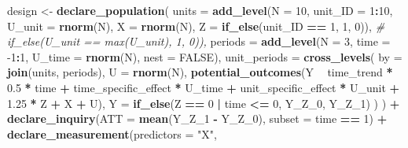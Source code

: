 \documentclass[
]{article}
\newenvironment{Shaded}{\begin{snugshade}}{\end{snugshade}}
\newcommand{\CommentTok}[1]{\textcolor[rgb]{0.56,0.35,0.01}{\textit{#1}}}
\newcommand{\DataTypeTok}[1]{\textcolor[rgb]{0.13,0.29,0.53}{#1}}
\newcommand{\DecValTok}[1]{\textcolor[rgb]{0.00,0.00,0.81}{#1}}
\newcommand{\FloatTok}[1]{\textcolor[rgb]{0.00,0.00,0.81}{#1}}
\newcommand{\KeywordTok}[1]{\textcolor[rgb]{0.13,0.29,0.53}{\textbf{#1}}}
\newcommand{\NormalTok}[1]{#1}
\newcommand{\OperatorTok}[1]{\textcolor[rgb]{0.81,0.36,0.00}{\textbf{#1}}}
\newcommand{\OtherTok}[1]{\textcolor[rgb]{0.56,0.35,0.01}{#1}}
\newcommand{\StringTok}[1]{\textcolor[rgb]{0.31,0.60,0.02}{#1}}
\begin{document}
\begin{Shaded}
\begin{Highlighting}[]
\NormalTok{design <-}\StringTok{ }
\StringTok{  }\KeywordTok{declare_population}\NormalTok{(}
    \DataTypeTok{units =} \KeywordTok{add_level}\NormalTok{(}\DataTypeTok{N =} \DecValTok{10}\NormalTok{, }\DataTypeTok{unit_ID =} \DecValTok{1}\OperatorTok{:}\DecValTok{10}\NormalTok{, }\DataTypeTok{U_unit =} \KeywordTok{rnorm}\NormalTok{(N), }\DataTypeTok{X =} \KeywordTok{rnorm}\NormalTok{(N), }\DataTypeTok{Z =} \KeywordTok{if_else}\NormalTok{(unit_ID }\OperatorTok{==}\StringTok{ }\DecValTok{1}\NormalTok{, }\DecValTok{1}\NormalTok{, }\DecValTok{0}\NormalTok{)), }\CommentTok{# if_else(U_unit == max(U_unit), 1, 0)),}
    \DataTypeTok{periods =} \KeywordTok{add_level}\NormalTok{(}\DataTypeTok{N =} \DecValTok{3}\NormalTok{, }\DataTypeTok{time =} \DecValTok{-1}\OperatorTok{:}\DecValTok{1}\NormalTok{, }\DataTypeTok{U_time =} \KeywordTok{rnorm}\NormalTok{(N), }\DataTypeTok{nest =} \OtherTok{FALSE}\NormalTok{),}
    \DataTypeTok{unit_periods =} \KeywordTok{cross_levels}\NormalTok{(}
      \DataTypeTok{by =} \KeywordTok{join}\NormalTok{(units, periods), }
      \DataTypeTok{U =} \KeywordTok{rnorm}\NormalTok{(N),}
      \KeywordTok{potential_outcomes}\NormalTok{(Y }\OperatorTok{~}\StringTok{ }\NormalTok{time_trend }\OperatorTok{*}\StringTok{ }\FloatTok{0.5} \OperatorTok{*}\StringTok{ }\NormalTok{time }\OperatorTok{+}\StringTok{ }\NormalTok{time_specific_effect }\OperatorTok{*}\StringTok{ }\NormalTok{U_time }\OperatorTok{+}\StringTok{ }
\StringTok{          }\NormalTok{unit_specific_effect }\OperatorTok{*}\StringTok{ }\NormalTok{U_unit }\OperatorTok{+}\StringTok{ }
\StringTok{            }\FloatTok{1.25} \OperatorTok{*}\StringTok{ }\NormalTok{Z }\OperatorTok{+}\StringTok{ }\NormalTok{X }\OperatorTok{+}\StringTok{ }\NormalTok{U),}
      \DataTypeTok{Y =} \KeywordTok{if_else}\NormalTok{(Z }\OperatorTok{==}\StringTok{ }\DecValTok{0} \OperatorTok{|}\StringTok{ }\NormalTok{time }\OperatorTok{<=}\StringTok{ }\DecValTok{0}\NormalTok{, Y_Z_}\DecValTok{0}\NormalTok{, Y_Z_}\DecValTok{1}\NormalTok{)}
\NormalTok{    )}
\NormalTok{  ) }\OperatorTok{+}\StringTok{ }
\StringTok{  }\KeywordTok{declare_inquiry}\NormalTok{(}\DataTypeTok{ATT =} \KeywordTok{mean}\NormalTok{(Y_Z_}\DecValTok{1} \OperatorTok{-}\StringTok{ }\NormalTok{Y_Z_}\DecValTok{0}\NormalTok{), }\DataTypeTok{subset =}\NormalTok{ time }\OperatorTok{==}\StringTok{ }\DecValTok{1}\NormalTok{) }\OperatorTok{+}\StringTok{ }
\StringTok{  }\KeywordTok{declare_measurement}\NormalTok{(}\DataTypeTok{predictors =} \StringTok{"X"}\NormalTok{,}

\end{Highlighting}
\end{Shaded}
\end{document}
